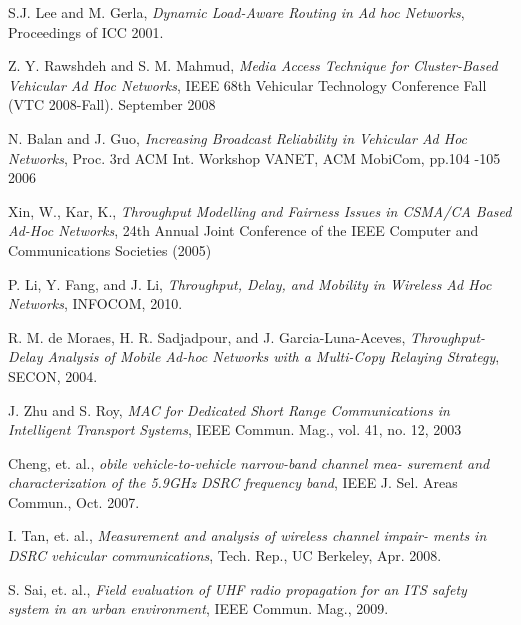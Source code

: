 \documentclass[runningheads,a4paper]{llncs}
\begin{document}
\begin{thebibliography}{4}
	S.J. Lee and M. Gerla, {\em Dynamic Load-Aware Routing in Ad hoc Networks}, Proceedings of ICC 2001.
	
	Z. Y. Rawshdeh and S. M. Mahmud, {\em Media Access Technique for Cluster-Based Vehicular
	Ad Hoc Networks}, IEEE 68th Vehicular Technology Conference Fall (VTC 2008-Fall). September 2008 
	
	N. Balan and J. Guo, {\em Increasing Broadcast Reliability in Vehicular Ad Hoc Networks}, Proc. 3rd ACM Int. Workshop VANET, ACM MobiCom,  pp.104 -105 2006
	
	Xin, W., Kar, K., {\em Throughput Modelling and Fairness Issues in CSMA/CA Based Ad-Hoc Networks}, 24th Annual Joint Conference of the IEEE Computer and Communications Societies (2005)
	
	P. Li, Y. Fang, and J. Li, {\em Throughput, Delay, and Mobility in Wireless Ad Hoc Networks}, INFOCOM, 2010.
	
	R. M. de Moraes, H. R. Sadjadpour, and J. Garcia-Luna-Aceves, {\em Throughput-Delay Analysis of Mobile Ad-hoc Networks with a Multi-Copy Relaying Strategy}, SECON, 2004.
	
	J. Zhu and S. Roy, {\em MAC for Dedicated Short Range Communications in Intelligent Transport Systems}, IEEE Commun. Mag.,  vol. 41,  no. 12,  2003

	Cheng, et. al., {\em obile vehicle-to-vehicle narrow-band channel mea- surement and characterization of the 5.9GHz DSRC frequency band}, IEEE J. Sel. Areas Commun., Oct. 2007.

	I. Tan, et. al., {\em Measurement and analysis of wireless channel impair- ments in DSRC vehicular communications}, Tech. Rep., UC Berkeley, Apr. 2008.

	S. Sai, et. al., {\em Field evaluation of UHF radio propagation for an ITS safety system in an urban environment}, IEEE Commun. Mag., 2009.

	
	

\end{thebibliography}
\end{document}
